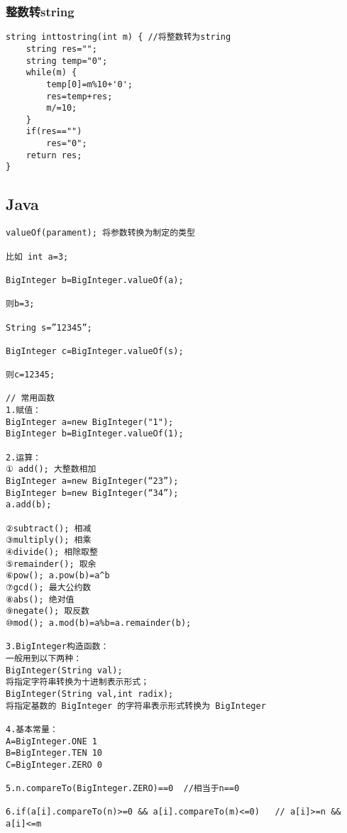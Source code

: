 \subsubsection{整数转string}
\begin{lstlisting}
string inttostring(int m) {	//将整数转为string
	string res="";
	string temp="0";
	while(m) {
		temp[0]=m%10+'0';
		res=temp+res;
		m/=10;
	}
	if(res=="")
		res="0";
	return res;
}
\end{lstlisting}


\subsection{Java}
\begin{lstlisting}
valueOf(parament); 将参数转换为制定的类型

比如 int a=3;

BigInteger b=BigInteger.valueOf(a);

则b=3;

String s=”12345”;

BigInteger c=BigInteger.valueOf(s);

则c=12345;

// 常用函数
1.赋值：
BigInteger a=new BigInteger("1");
BigInteger b=BigInteger.valueOf(1);

2.运算：
① add(); 大整数相加 
BigInteger a=new BigInteger(“23”); 
BigInteger b=new BigInteger(“34”); 
a.add(b);

②subtract(); 相减 
③multiply(); 相乘 
④divide(); 相除取整 
⑤remainder(); 取余 
⑥pow(); a.pow(b)=a^b 
⑦gcd(); 最大公约数 
⑧abs(); 绝对值 
⑨negate(); 取反数 
⑩mod(); a.mod(b)=a%b=a.remainder(b); 

3.BigInteger构造函数： 
一般用到以下两种： 
BigInteger(String val); 
将指定字符串转换为十进制表示形式； 
BigInteger(String val,int radix); 
将指定基数的 BigInteger 的字符串表示形式转换为 BigInteger

4.基本常量： 
A=BigInteger.ONE 1 
B=BigInteger.TEN 10 
C=BigInteger.ZERO 0 

5.n.compareTo(BigInteger.ZERO)==0  //相当于n==0

6.if(a[i].compareTo(n)>=0 && a[i].compareTo(m)<=0)   // a[i]>=n && a[i]<=m


\end{lstlisting}
